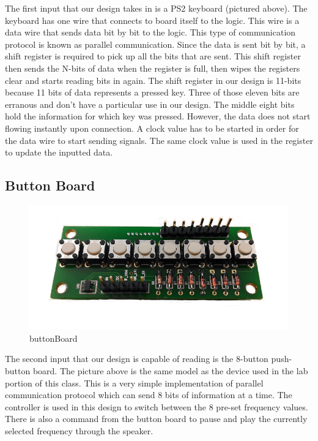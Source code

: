 \documentclass[a4paper]{article}
\begin{document}
The first input that our design takes in is a PS2 keyboard (pictured above). The keyboard has one wire that connects to board itself to the logic. This wire is a data wire that sends data bit by bit to the logic. This type of communication protocol is known as parallel communication. Since the data is sent bit by bit, a shift register is required to pick up all the bits that are sent. This shift register then sends the N-bits of data when the register is full, then wipes the registers clear and starts reading bits in again. The shift register in our design is 11-bits because 11 bits of data represents a pressed key. Three of those eleven bits are erranous and don’t have a particular use in our design. The middle eight bits hold the information for which key was pressed. However, the data does not start flowing instantly upon connection. A clock value has to be started in order for the data wire to start sending signals. The same clock value is used in the register to update the inputted data. \pagebreak

\subsection{Button Board}

\begin{figure}[h]
    \includegraphics[width=6 in]{./Images/bBoard.png}
    \caption{buttonBoard}
    \label{fig:3}
\end{figure}

The second input that our design is capable of reading is the 8-button push-button board. The picture above is the same model as the device used in the lab portion of this class. This is a very simple implementation of parallel communication protocol which can send 8 bits of information at a time. The controller is used in this design to switch between the 8 pre-set frequency values. There is also a command from the button board to pause and play the currently selected frequency through the speaker.
\end{document}

